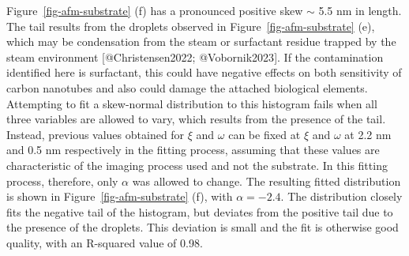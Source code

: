 \documentclass[
  letterpaper,
  DIV=11,
  numbers=noendperiod]{scrartcl}
\begin{document}
Figure~\ref{fig-afm-substrate} (f) has a pronounced positive skew
\(\sim\) 5.5 nm in length. The tail results from the droplets observed
in Figure~\ref{fig-afm-substrate} (e), which may be condensation from
the steam or surfactant residue trapped by the steam environment
{[}@Christensen2022; @Vobornik2023{]}. If the contamination identified
here is surfactant, this could have negative effects on both sensitivity
of carbon nanotubes and also could damage the attached biological
elements. Attempting to fit a skew-normal distribution to this histogram
fails when all three variables are allowed to vary, which results from
the presence of the tail. Instead, previous values obtained for \(\xi\)
and \(\omega\) can be fixed at \(\xi\) and \(\omega\) at 2.2 nm and 0.5
nm respectively in the fitting process, assuming that these values are
characteristic of the imaging process used and not the substrate. In
this fitting process, therefore, only \(\alpha\) was allowed to change.
The resulting fitted distribution is shown in
Figure~\ref{fig-afm-substrate} (f), with \(\alpha = -2.4\). The
distribution closely fits the negative tail of the histogram, but
deviates from the positive tail due to the presence of the droplets.
This deviation is small and the fit is otherwise good quality, with an
R-squared value of 0.98.
\end{document}
